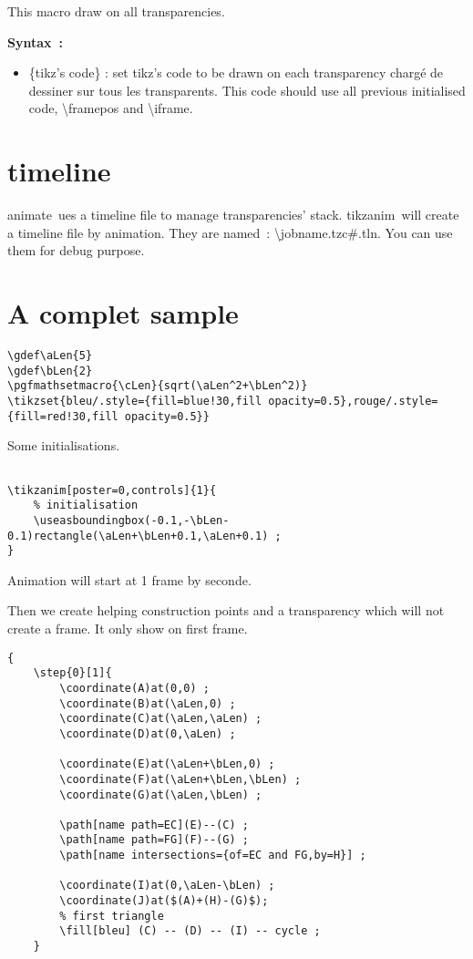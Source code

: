 \documentclass[a4paper,12pt]{article}
\newcommand\Tikz{{\ttfamily tikz}}
\newcommand\TikzAnimate{{\ttfamily tikzanim}}
\newcommand\Animate{{\ttfamily animate}}
\begin{document}
This macro draw on all transparencies.

\textbf{Syntax~:}


	\begin{itemize}
		\item {\ttfamily\{tikz's code\}} : set \Tikz's code to be drawn on each transparency chargé de dessiner sur tous les transparents. This code should use all previous initialised code,
		{\ttfamily\textbackslash framepos} and {\ttfamily\textbackslash iframe}.
	\end{itemize}
	
\section{\ttfamily timeline}

\Animate\ ues a {\ttfamily timeline} file to manage transparencies' stack. \TikzAnimate\ will create a {\ttfamily timeline} file by animation. They are named~: {\ttfamily \textbackslash jobname.tzc\#.tln}. You can use them for debug purpose.
	
\section{A complet sample}

\begin{lstlisting}[name=exemplecomplet]
\gdef\aLen{5}
\gdef\bLen{2}
\pgfmathsetmacro{\cLen}{sqrt(\aLen^2+\bLen^2)}
\tikzset{bleu/.style={fill=blue!30,fill opacity=0.5},rouge/.style={fill=red!30,fill opacity=0.5}} 
\end{lstlisting}

Some initialisations.


\begin{lstlisting}[name=exemplecomplet]

\tikzanim[poster=0,controls]{1}{
	% initialisation 
	\useasboundingbox(-0.1,-\bLen-0.1)rectangle(\aLen+\bLen+0.1,\aLen+0.1) ;
}	
\end{lstlisting}

Animation will start at 1 frame by seconde.

Then we create helping construction points and a transparency which will not create a frame. It only show on first frame.

\begin{lstlisting}[name=exemplecomplet]
{
	\step{0}[1]{		
		\coordinate(A)at(0,0) ;
		\coordinate(B)at(\aLen,0) ;
		\coordinate(C)at(\aLen,\aLen) ;
		\coordinate(D)at(0,\aLen) ;

		\coordinate(E)at(\aLen+\bLen,0) ;
		\coordinate(F)at(\aLen+\bLen,\bLen) ;
		\coordinate(G)at(\aLen,\bLen) ;

		\path[name path=EC](E)--(C) ;
		\path[name path=FG](F)--(G) ;
		\path[name intersections={of=EC and FG,by=H}] ;

		\coordinate(I)at(0,\aLen-\bLen) ;
		\coordinate(J)at($(A)+(H)-(G)$);
		% first triangle
		\fill[bleu] (C) -- (D) -- (I) -- cycle ;
	}
\end{lstlisting}
\end{document}
